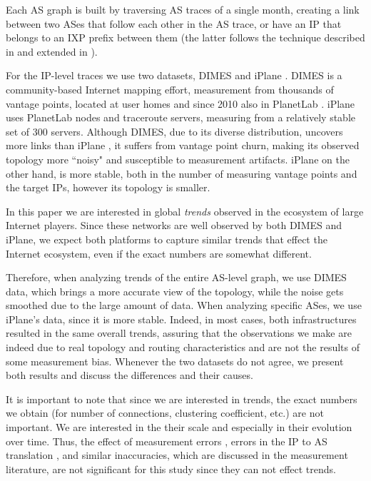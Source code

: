 \documentclass[conference]{IEEEtran}
\begin{document}
Each AS graph is built by traversing AS traces of a single month, creating a link between
two ASes that follow each other in the AS trace, or have an IP that belongs to an IXP prefix between them (the latter follows the technique described in \cite{lordoflinks} and extended in \cite{ixpsmapped}).

For the IP-level traces we use two datasets, DIMES \cite{dimes-ccr} and iPlane \cite{iPlane}.
DIMES is a community-based Internet mapping effort, measurement from thousands of vantage points, located
at user homes and since 2010 also in PlanetLab \cite{PlanetLab}. iPlane uses PlanetLab nodes and traceroute
servers, measuring from a relatively stable set of 300 servers. Although DIMES, due to its
diverse distribution, uncovers more links than iPlane \cite{quantify-jsac}, it suffers
from vantage point churn, making its observed topology more ``noisy" and susceptible to measurement
artifacts. iPlane on the other hand,
is more stable, both in the number of measuring vantage points and the target IPs, however its
topology is smaller.


In this paper we are interested
in global {\em trends} observed in the ecosystem of large Internet players. Since these networks are well
observed by both DIMES and iPlane, we expect both platforms to capture similar trends that
effect the Internet ecosystem, even if the exact numbers are somewhat different.

Therefore,
when analyzing trends of the entire AS-level graph, we use DIMES data, which
brings a more accurate view of the topology, while the noise gets smoothed due
to the large amount of data. When analyzing specific ASes, we
use iPlane's data, since it is more stable. Indeed, in most cases, both infrastructures resulted
in the same overall trends, assuring that the observations we make are indeed due to real topology and routing characteristics
and are not the results of some measurement bias. Whenever the two datasets do not agree, we
present both results and discuss the differences and their causes.

It is important to note that since we are interested in trends, the exact numbers we obtain (for number of connections, 
clustering coefficient, etc.) are not important.
We are interested in the their scale and especially in their evolution over time.  
Thus, the effect of measurement errors \cite{paris}, errors in the IP to AS translation \cite{mao03towards,mao04scalable,1064257}, and similar inaccuracies,   which are discussed in the measurement literature, are not significant for this study since they can not effect trends.
\end{document}
